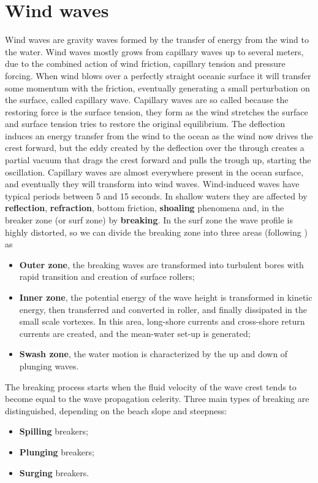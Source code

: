 \section{Wind waves}
Wind waves are gravity waves formed by the transfer of energy from the wind to the water. Wind waves mostly grows from capillary waves up to several meters, due to the combined action of wind friction, capillary tension and pressure forcing. When wind blows over a perfectly straight oceanic surface it will transfer some momentum with the friction, eventually generating a small perturbation on the surface, called capillary wave. Capillary waves are so called because the restoring force is the surface tension, they form as the wind stretches the surface and surface tension tries to restore the original equilibrium. The deflection induces an energy transfer from the wind to the ocean as the wind now drives the crest forward, but the eddy created by the deflection over the through creates a partial vacuum that drags the crest forward and pulls the trough up, starting the oscillation. Capillary waves are almost everywhere present in the ocean surface, and eventually they will transform into wind waves.
Wind-induced waves have typical periods between 5 and 15 seconds. In shallow waters they are affected by \textbf{reflection}, \textbf{refraction}, bottom friction, \textbf{shoaling} phenomena and, in the breaker zone (or surf zone) by \textbf{breaking}. In the surf zone the wave profile is highly distorted, so we can divide the breaking zone into three areas (following \cite{BoreBascoSvendsen}) as 
\begin{itemize}
\item \textbf{Outer zone}, the breaking waves are transformed into turbulent bores with rapid transition and creation of surface rollers;
\item \textbf{Inner zone}, the potential energy of the wave height is transformed in kinetic energy, then transferred and converted in roller, and finally dissipated in the small scale vortexes. In this area, long-shore currents and cross-shore return currents are created, and the mean-water set-up is generated;
\item \textbf{Swash zone}, the water motion is characterized by the up and down of plunging waves.
\end{itemize}
The breaking process starts when the fluid velocity of the wave crest tends to become equal to the wave propagation celerity. Three main types of breaking are distinguished, depending on the beach slope and steepness:
\begin{itemize}
\item \textbf{Spilling} breakers;
\item \textbf{Plunging} breakers;
\item \textbf{Surging} breakers.
\end{itemize}
